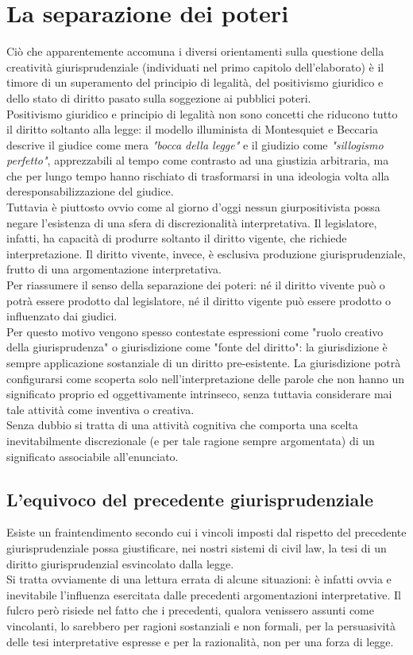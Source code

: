 \section{La separazione dei poteri}
Ciò che apparentemente accomuna i diversi orientamenti sulla questione della creatività giurisprudenziale (individuati nel primo capitolo dell'elaborato) è il timore di un superamento del principio di legalità, del positivismo giuridico e dello stato di diritto pasato sulla soggezione ai pubblici poteri.
\\Positivismo giuridico e principio di legalità non sono concetti che riducono tutto il diritto soltanto alla legge: il modello illuminista di Montesquiet e Beccaria descrive il giudice come mera \textit{"bocca della legge"} e il giudizio come \textit{"sillogismo perfetto"}, apprezzabili al tempo come contrasto ad una giustizia arbitraria, ma che per lungo tempo hanno rischiato di trasformarsi in una ideologia volta alla deresponsabilizzazione del giudice.
\\Tuttavia è piuttosto ovvio come al giorno d'oggi nessun giurpositivista possa negare l'esistenza di una sfera di discrezionalità interpretativa.
Il legislatore, infatti, ha capacità di produrre soltanto il diritto vigente, che richiede interpretazione. Il diritto vivente, invece, è esclusiva produzione giurisprudenziale, frutto di una argomentazione interpretativa.
\\Per riassumere il senso della separazione dei poteri: né il diritto vivente può o potrà essere prodotto dal legislatore, né il diritto vigente può essere prodotto o influenzato dai giudici.
\\Per questo motivo vengono spesso contestate espressioni come "ruolo creativo della giurisprudenza" o giurisdizione come "fonte del diritto": la giurisdizione è sempre applicazione sostanziale di un diritto pre-esistente. La giurisdizione potrà configurarsi come scoperta solo nell'interpretazione delle parole che non hanno un significato proprio ed oggettivamente intrinseco, senza tuttavia considerare mai tale attività come inventiva o creativa.
\\Senza dubbio si tratta di una attività cognitiva che comporta una scelta inevitabilmente discrezionale (e per tale ragione sempre argomentata) di un significato associabile all'enunciato.
\subsection{L'equivoco del precedente giurisprudenziale}
Esiste un fraintendimento secondo cui i vincoli imposti dal rispetto del precedente giurisprudenziale possa giustificare, nei nostri sistemi di civil law, la tesi di un diritto giurisprudenzial esvincolato dalla legge.
\\Si tratta ovviamente di una lettura errata di alcune situazioni: è infatti ovvia e inevitabile l'influenza esercitata dalle precedenti argomentazioni interpretative.
Il fulcro però risiede nel fatto che i precedenti, qualora venissero assunti come vincolanti, lo sarebbero per ragioni sostanziali e non formali, per la persuasività delle tesi interpretative espresse e per la razionalità, non per una forza di legge.

